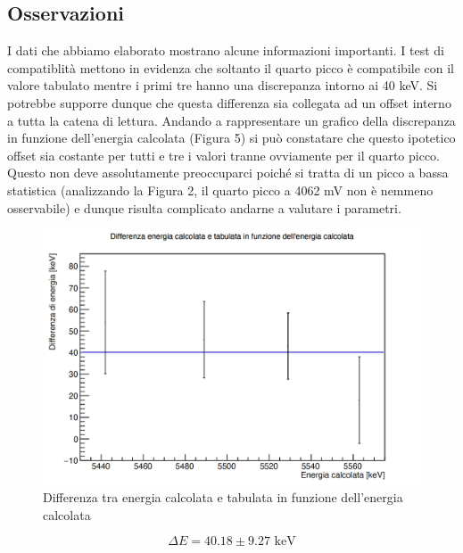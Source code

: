 \documentclass[a4paper,10pt]{article}
\newcommand*{\unit}[1]{\ensuremath{\mathrm{\,#1}}}
\begin{document}

\subsection{Osservazioni}
I dati che abbiamo elaborato mostrano alcune informazioni importanti. I test di compatiblit\`a mettono in evidenza che soltanto il quarto picco \`e compatibile con il valore tabulato mentre i primi tre hanno una discrepanza intorno ai 40 keV. Si potrebbe supporre dunque che questa differenza sia collegata ad un offset interno a tutta la catena di lettura. Andando a rappresentare un grafico della discrepanza in funzione dell'energia calcolata (Figura 5) si pu\`o constatare che questo ipotetico offset sia costante per tutti e tre i valori tranne ovviamente per il quarto picco. Questo non deve assolutamente preoccuparci poich\'e si tratta di un picco a bassa statistica (analizzando la Figura 2, il quarto picco a 4062 mV non \`e nemmeno osservabile) e dunque risulta complicato andarne a valutare i parametri.

\begin{figure}[H]
    \centering
    \includegraphics[scale=0.45]{grafici/discrepanza}
    \caption{Differenza tra energia calcolata e tabulata in funzione dell'energia calcolata}
\end{figure}

$$
    \Delta E = 40.18 \pm 9.27\, \unit{keV}
$$
\end{document}
